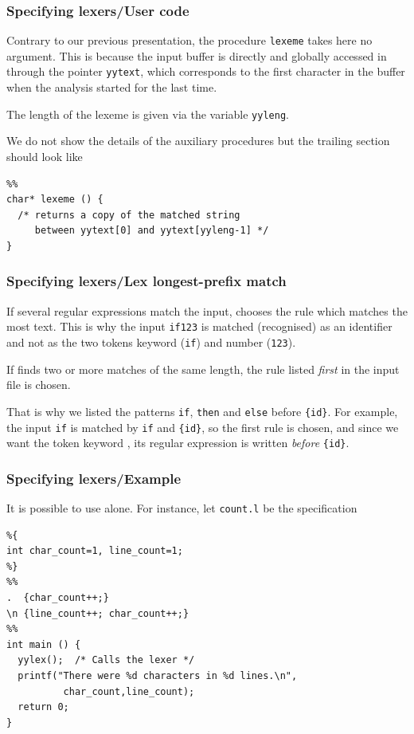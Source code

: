 %
\begin{frame}[containsverbatim]
\frametitle{Specifying lexers/User code}

Contrary to our previous presentation, the procedure \texttt{lexeme}
takes here no argument. This is because the input buffer is directly
and globally accessed in \Lex through the pointer \texttt{yytext},
which corresponds to the first character in the buffer when the
analysis started for the last time.

\bigskip

The length of the lexeme is given via the variable \texttt{yyleng}.

\bigskip

We do not show the details of the auxiliary procedures but the
trailing section should look like
{\small
\begin{verbatim}
%%
char* lexeme () {
  /* returns a copy of the matched string
     between yytext[0] and yytext[yyleng-1] */
}
\end{verbatim}
}

\end{frame}

%
\begin{frame}[containsverbatim]
\frametitle{Specifying lexers/Lex longest-prefix match}

If several regular expressions match the input, \Lex chooses the rule
which matches the most text. This is why the input \verb+if123+ is
matched (recognised) as an identifier and not as the two tokens
keyword (\verb+if+) and number (\verb+123+).

\bigskip

If \Lex finds two or more matches of the same length, the rule listed
\emph{first} in the \Lex input file is chosen.

\bigskip

That is why we listed the patterns \verb+if+, \verb+then+ and
\verb+else+ before \verb+{id}+. For example, the input \verb+if+ is
matched by \verb+if+ and \verb+{id}+, so the first rule is chosen, and
since we want the token keyword , its regular expression is
written \emph{before} \verb+{id}+.

\end{frame}

%
\begin{frame}[containsverbatim]
\frametitle{Specifying lexers/Example}

It is possible to use \Lex alone. For instance, let \texttt{count.l}
be the \Lex specification
{\small
\begin{verbatim}
%{
int char_count=1, line_count=1;
%}
%%
.  {char_count++;}
\n {line_count++; char_count++;}
%%
int main () {
  yylex();  /* Calls the lexer */
  printf("There were %d characters in %d lines.\n",
          char_count,line_count);
  return 0;
}
\end{verbatim}
}

\end{frame}


